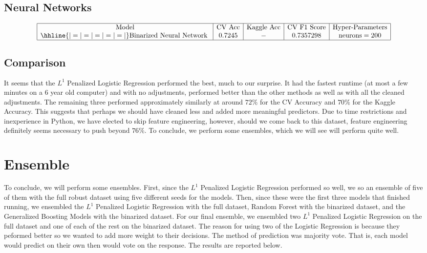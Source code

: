 \documentclass{article}
\begin{document}
\subsection{Neural Networks}
$$\begin{array}{|c|c|c|c|c|}
\hline
\text{Model} & \text{CV Acc} & \text{Kaggle Acc} & \text{CV F1 Score} & \text{Hyper-Parameters} \\
\hhline{|=|=|=|=|=|}
\text{Binarized Neural Network } & 0.7245 & - & 0.7357298 & \text{neurons} = 200 \\
\hline
\end{array}$$

\subsection{Comparison}
It seems that the $L^1$ Penalized Logistic Regression performed the best, much to our surprise. It had the fastest runtime (at most a few minutes on a 6 year old computer) and with no adjustments, performed better than the other methods as well as with all the cleaned adjustments. The remaining three performed approximately similarly at around $72\%$ for the CV Accuracy and $70\%$ for the Kaggle Accuracy. This suggests that perhaps we should have cleaned less and added more meaningful predictors. Due to time restrictions and inexperience in Python, we have elected to skip feature engineering, however, should we come back to this dataset, feature engineering definitely seems necessary to push beyond $76\%$. To conclude, we perform some ensembles, which we will see will perform quite well.

\section{Ensemble}
To conclude, we will perform some ensembles. First, since the $L^1$ Penalized Logistic Regression performed so well, we so an ensemble of five of them with the full robust dataset using five different seeds for the models. Then, since these were the first three models that finished running, we ensembled the $L^1$ Penalized Logistic Regression with the full dataset, Random Forest with the binarized dataset, and the Generalized Boosting Models with the binarized dataset. For our final ensemble, we ensembled two $L^1$ Penalized Logistic Regression on the full dataset and one of each of the rest on the binarized dataset. The reason for using two of the Logistic Regression is because they peformed better so we wanted to add more weight to their decisions. The method of prediction was majority vote. That is, each model would predict on their own then would vote on the response. The results are reported below.
\end{document}
